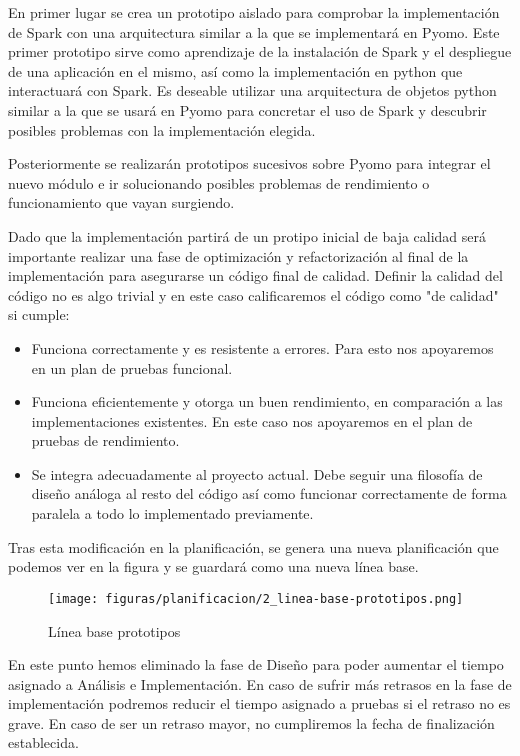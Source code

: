 En primer lugar se crea un prototipo aislado para comprobar la implementación de Spark con una arquitectura similar a la que se implementará en Pyomo. Este primer prototipo sirve como aprendizaje de la instalación de Spark y el despliegue de una aplicación en el mismo, así como la implementación en python que interactuará con Spark. Es deseable utilizar una arquitectura de objetos python similar a la que se usará en Pyomo para concretar el uso de Spark y descubrir posibles problemas con la implementación elegida.

Posteriormente se realizarán prototipos sucesivos sobre Pyomo para integrar el nuevo módulo e ir solucionando posibles problemas de rendimiento o funcionamiento que vayan surgiendo. 

Dado que la implementación partirá de un protipo inicial de baja calidad será importante realizar una fase de optimización y refactorización al final de la implementación para asegurarse un código final de calidad. Definir la calidad del código no es algo trivial y en este caso calificaremos el código como "de calidad" si cumple:

\begin{itemize}
    \item Funciona correctamente y es resistente a errores. Para esto nos apoyaremos en un plan de pruebas funcional.
    \item Funciona eficientemente y otorga un buen rendimiento, en comparación a las implementaciones existentes. En este caso nos apoyaremos en el plan de pruebas de rendimiento.
    \item Se integra adecuadamente al proyecto actual. Debe seguir una filosofía de diseño análoga al resto del código así como funcionar correctamente de forma paralela a todo lo implementado previamente.
\end{itemize}

Tras esta modificación en la planificación, se genera una nueva planificación que podemos ver en la figura y se guardará como una nueva línea base.%

\begin{figure}[H]
    \centerline{\texttt{[image: figuras/planificacion/2\_linea-base-prototipos.png]}}
    \caption{Línea base prototipos}
\end{figure}

En este punto hemos eliminado la fase de Diseño para poder aumentar el tiempo asignado a Análisis e Implementación. En caso de sufrir más retrasos en la fase de implementación podremos reducir el tiempo asignado a pruebas si el retraso no es grave. En caso de ser un retraso mayor, no cumpliremos la fecha de finalización establecida.

